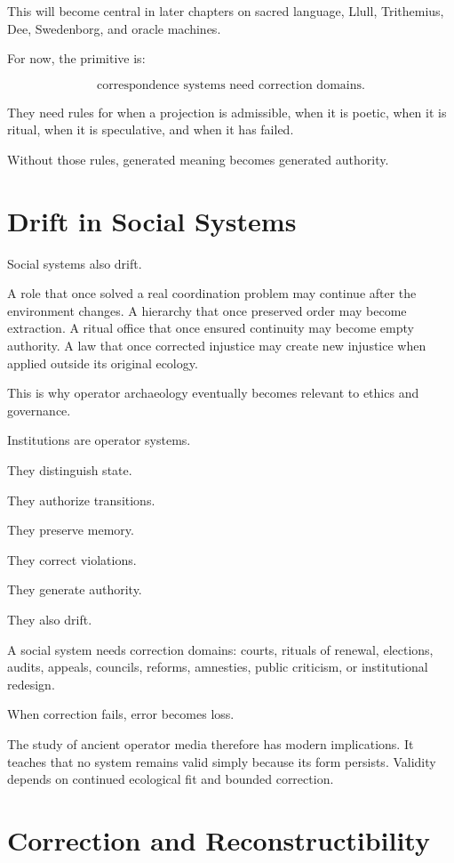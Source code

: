 \documentclass[11pt]{book}
\begin{document}
This will become central in later chapters on sacred language, Llull, Trithemius, Dee, Swedenborg, and oracle machines.

For now, the primitive is:

\[
\text{correspondence systems need correction domains}.
\]

They need rules for when a projection is admissible, when it is poetic, when it is ritual, when it is speculative, and when it has failed.

Without those rules, generated meaning becomes generated authority.

\section{Drift in Social Systems}

Social systems also drift.

A role that once solved a real coordination problem may continue after the environment changes. A hierarchy that once preserved order may become extraction. A ritual office that once ensured continuity may become empty authority. A law that once corrected injustice may create new injustice when applied outside its original ecology.

This is why operator archaeology eventually becomes relevant to ethics and governance.

Institutions are operator systems.

They distinguish state.

They authorize transitions.

They preserve memory.

They correct violations.

They generate authority.

They also drift.

A social system needs correction domains: courts, rituals of renewal, elections, audits, appeals, councils, reforms, amnesties, public criticism, or institutional redesign.

When correction fails, error becomes loss.

The study of ancient operator media therefore has modern implications. It teaches that no system remains valid simply because its form persists. Validity depends on continued ecological fit and bounded correction.

\section{Correction and Reconstructibility}
\end{document}
